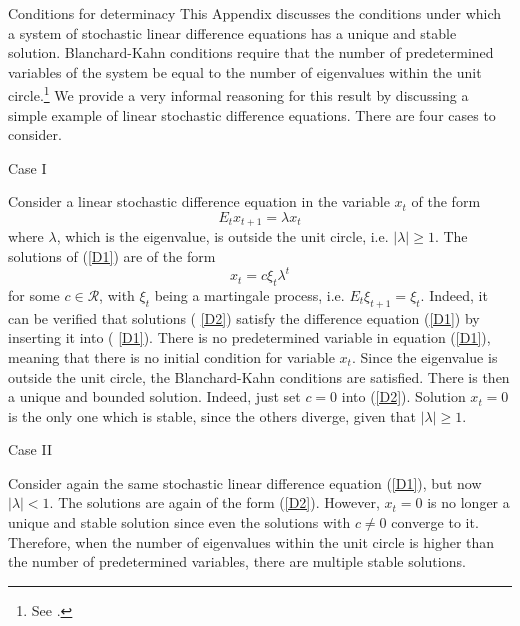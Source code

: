 \documentclass[11pt,aspectratio=169]{beamer}
\begin{document}
\begin{frame}[label=Appendix G]{Conditions for determinacy}
\small
\label{Appendix5} This Appendix discusses the conditions under which a
system of stochastic linear difference equations has a unique and stable
solution. Blanchard-Kahn conditions require that the number of predetermined
variables of the system be equal to the number of eigenvalues within the
unit circle.\footnote{%
See \cite{blanchard1980}.} We provide a very informal reasoning for
this result by discussing a simple example of linear stochastic difference
equations. There are four cases to consider.
\end{frame}
\begin{frame}{Case I}
\small

Consider a linear stochastic difference equation in the variable $x_{t}$ of
the form%
\begin{equation}
E_{t}x_{t+1}=\lambda x_{t}  \label{D1}
\end{equation}%
where $\lambda $, which is the eigenvalue, is outside the unit circle, i.e. $%
\left\vert \lambda \right\vert \geq 1$. The solutions of (\ref{D1}) are of
the form%
\begin{equation}
x_{t}=c\xi _{t}\lambda ^{t}  \label{D2}
\end{equation}%
for some $c\in \mathcal{R}$, with $\xi _{t}$ being a martingale process,
i.e. $E_{t}\xi _{t+1}=\xi _{t}$. Indeed, it can be verified that solutions (%
\ref{D2}) satisfy the difference equation (\ref{D1}) by inserting it into (%
\ref{D1}). There is no predetermined variable in equation (\ref{D1}),
meaning that there is no initial condition for variable $x_{t}$. Since the
eigenvalue is outside the unit circle, the Blanchard-Kahn conditions are
satisfied. There is then a unique and bounded solution. Indeed, just set $%
c=0 $ into (\ref{D2})$.$ Solution $x_{t}=0$ is the only one which is stable,
since the others diverge, given that $\left\vert \lambda \right\vert \geq 1.$
\end{frame}
\begin{frame}{Case II}
\small

Consider again the same stochastic linear difference equation (\ref{D1}),
but now $\left\vert \lambda \right\vert <1$. The solutions are again of the
form (\ref{D2}). However, $x_{t}=0$ is no longer a unique and stable
solution since even the solutions with $c\neq 0$ converge to it. Therefore,
when the number of eigenvalues within the unit circle is higher than the
number of predetermined variables, there are multiple stable solutions.
\end{frame}
\end{document}
